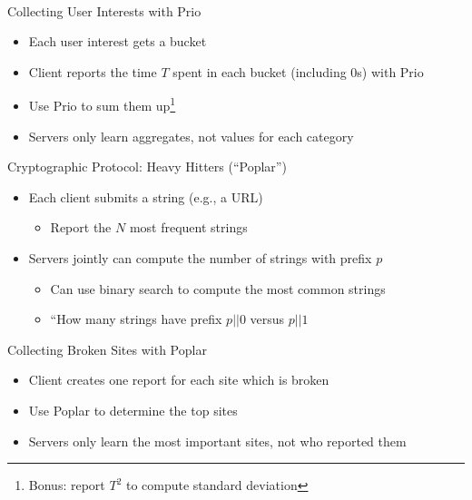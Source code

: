 \documentclass[helvetica]{beamer}
\begin{document}
\begin{frame}{Collecting User Interests with Prio}

  \begin{itemize}
  \item Each user interest gets a bucket
  \item Client reports the time $T$ spent in each bucket (including 0s) with Prio
  \item Use Prio to sum them up\footnote{Bonus: report $T^2$ to compute standard deviation}
  \item Servers only learn aggregates, not values for each category
  \end{itemize}
\end{frame}


\begin{frame}{Cryptographic Protocol: Heavy Hitters (``Poplar'') ~\cite{cryptoeprint:2021:017}}

  \begin{itemize}
  \item Each client submits a string (e.g., a URL)
    \begin{itemize}
    \item Report the $N$ most frequent strings
    \end{itemize}

  \item Servers jointly can compute the number of strings with prefix $p$
    \begin{itemize}
    \item Can use binary search to compute the most common strings
    \item ``How many strings have prefix $p || 0$ versus $p || 1$
    \end{itemize}
  \end{itemize}

\end{frame}

\begin{frame}{Collecting Broken Sites with Poplar}

  \begin{itemize}
  \item Client creates one report for each site which is broken
  \item Use Poplar to determine the top sites
  \item Servers only learn the most important sites, not who reported them
  \end{itemize}

\end{frame}
\end{document}
